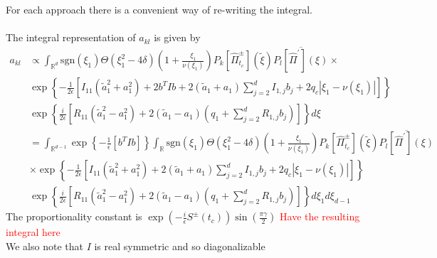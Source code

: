 For each approach there is a convenient way of re-writing the integral.
\\
\\
The integral representation of $a_{kl}$ is given by  
\begin{equation}
  \begin{split}
    a_{kl} &\propto 
    \int_{\mathbb{R}^{d}} \text{sgn}(\xi_1)
      \Theta(\xi_1^2 - 4\delta)\left( 1 + \frac{\xi_1}{\nu(\xi_1)} \right)
      P_k[\hat{\Pi}^{\pm}_{t_c}](\tilde{\xi})
      \overline{ P_l[\hat{\Pi}^\prime](\xi)} 
      \times 
      \\
      &
      \exp{\left\{
    -\frac{1}{2\epsilon}\left[ 
      I_{11}(\tilde{a}_1^2 + a_1^2) 
      + 2b^T I b + 2(\tilde{a}_1 + a_1)\sum_{j = 2}^d I_{1,j} b_j
    + 2q_c |\xi_1 - \nu(\xi_1)| 
    \right]
      \right\} }
    \\
    &
    \exp{\left\{
    \frac{i}{2\epsilon}\left[ 
      R_{11} (\tilde{a}_1^2 - a_1^2)  
      + 2(\tilde{a}_1 - a_1)\left(q_1 + \sum_{j=2}^d R_{1,j} b_j\right) 
    \right]
      \right\} }  d\xi
  \\
    &=\int_{\mathbb{R}^{d-1}}  
      \exp{\left\{
    -\frac{1}{\epsilon}\left[ 
       b^T I b 
    \right]
      \right\} }
      \int_{\mathbb{R}} \text{sgn}(\xi_1)
      \Theta(\xi_1^2 - 4\delta)\left( 1 + \frac{\xi_1}{\nu(\xi_1)} \right)
      P_k[\hat{\Pi}^{\pm}_{t_c}](\tilde{\xi})
      \overline{ P_l[\hat{\Pi}^\prime](\xi)} 
      \\
      &
      \times 
      \exp{\left\{
    -\frac{1}{2\epsilon}\left[ 
      I_{11}(\tilde{a}_1^2 + a_1^2) 
       + 2(\tilde{a}_1 + a_1)\sum_{j = 2}^d I_{1,j} b_j
    + 2q_c |\xi_1 - \nu(\xi_1)| 
    \right]
      \right\} }
    \\
    &
    \exp{\left\{
    \frac{i}{2\epsilon}\left[ 
      R_{11} (\tilde{a}_1^2 - a_1^2)  
      + 2(\tilde{a}_1 - a_1)\left(q_1 + \sum_{j=2}^d R_{1,j} b_j\right) 
    \right]
\right\} }  d\xi_1d\xi_{d-1}
  \end{split}
\end{equation}
The proportionality constant is $\exp{\left( -\frac{i}{\epsilon} S^{\pm}(t_c) \right)} \sin(\frac{\pi \gamma}{2})$
\textcolor{red}{Have the resulting integral here}
\\
We also note that $I$ is real symmetric and so diagonalizable
%
%
%
%
%
%
%
%
